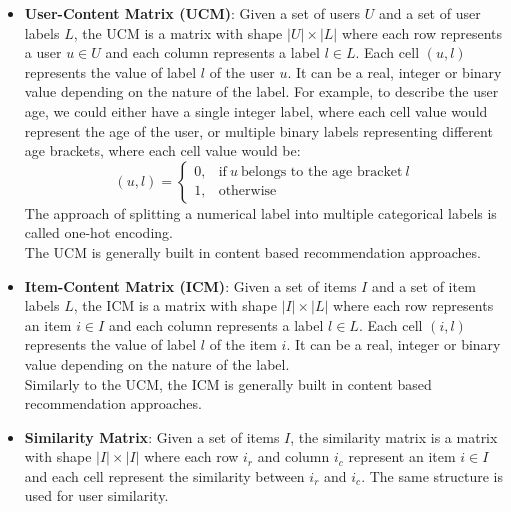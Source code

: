 \begin{itemize}

\item \textbf{User-Content Matrix (UCM)}: Given a set of users $U$ and a set of user labels $L$, the UCM is a matrix with shape $|U| \times |L|$ where each row represents a user $u \in U$ and each column represents a label $l \in L$. Each cell $(u,l)$ represents the value of label $l$ of the user $u$. It can be a real, integer or binary value depending on the nature of the label. For example, to describe the user age, we could either have a single integer label, where each cell value would represent the age of the user, or multiple binary labels representing different age brackets, where each cell value would be:
\begin{equation}
  (u,l)=
  \begin{cases}
    0, & \text{if}\ u\ \text{belongs to the age bracket}\ l\\
    1, & \text{otherwise}
  \end{cases}
\end{equation}
The approach of splitting a numerical label into multiple categorical labels is called one-hot encoding.\\
The UCM is generally built in content based recommendation approaches.

\item \textbf{Item-Content Matrix (ICM)}: Given a set of items $I$ and a set of item labels $L$, the ICM is a matrix with shape $|I| \times |L|$ where each row represents an item $i \in I$ and each column represents a label $l \in L$. Each cell $(i,l)$ represents the value of label $l$ of the item $i$. It can be a real, integer or binary value depending on the nature of the label.\\
Similarly to the UCM, the ICM is generally built in content based recommendation approaches.

\item \textbf{Similarity Matrix}: Given a set of items $I$, the similarity matrix is a matrix with shape $|I| \times |I|$ where each row $i_r$ and column $i_c$ represent an item $i \in I$ and each cell represent the similarity between $i_r$ and $i_c$. The same structure is used for user similarity.


\end{itemize}
